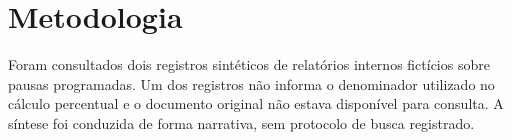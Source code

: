 \section{Metodologia}
Foram consultados dois registros sintéticos de relatórios internos fictícios sobre pausas programadas.
Um dos registros não informa o denominador utilizado no cálculo percentual e o documento original não estava disponível para consulta.
A síntese foi conduzida de forma narrativa, sem protocolo de busca registrado.
